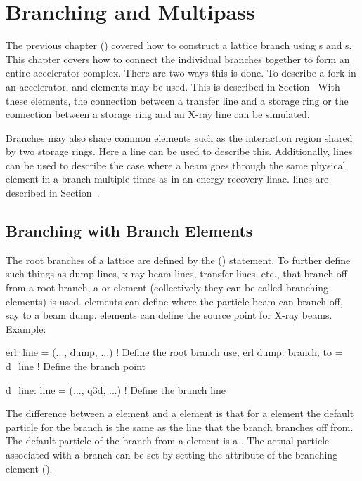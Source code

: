 \chapter{Branching and Multipass}
\label{c:branch.multi}

The previous chapter () covered how to construct a 
lattice branch using s and s. This chapter covers
how to connect the individual branches together to form an entire
accelerator complex. There are two ways this is done. To
describe a fork in an accelerator,  and 
elements may be used. This is described in Section~
With these elements, the connection between a transfer line and a
storage ring or the connection between a storage ring and an X-ray 
line can be simulated.

Branches may also share common elements such as the interaction region
shared by two storage rings. Here a  line can be used
to describe this. Additionally,  lines can be used
to describe the case where a beam goes through the same physical
element in a branch multiple times as in an energy recovery linac.
 lines are described in Section~.

\section{Branching with Branch Elements}
\label{s:branching}

The root branches of a lattice are defined by the 
() statement. To further define such things as dump lines,
x-ray beam lines, transfer lines, etc., that branch off from a root
branch, a  or  element (collectively they
can be called branching elements) is used.   elements can
define where the particle beam can branch off, say to a beam
dump.  elements can define the source point for
X-ray beams.  Example:
\begin{example}
  erl: line = (..., dump, ...)               ! Define the root branch 
  use, erl
  dump: branch, to = d_line                  ! Define the branch point

  d_line: line = (..., q3d, ...)             ! Define the branch line
\end{example}
The difference between a  element and a 
element is that for a  element the default particle for the
branch is the same as the line that the branch branches off from. The
default particle of the branch from a  element is a
. The actual particle associated with a branch can be set
by setting the  attribute of the branching element
().


